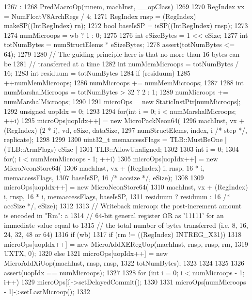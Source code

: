\begin{DoxyCode}
1267                                              :
1268     PredMacroOp(mnem, machInst, __opClass)
1269 {
1270     RegIndex vx = NumFloatV8ArchRegs / 4;
1271     RegIndex rnsp = (RegIndex) makeSP((IntRegIndex) rn);
1272     bool baseIsSP = isSP((IntRegIndex) rnsp);
1273 
1274     numMicroops = wb ? 1 : 0;
1275 
1276     int eSizeBytes = 1 << eSize;
1277     int totNumBytes = numStructElems * eSizeBytes;
1278     assert(totNumBytes <= 64);
1279 
1280     // The guiding principle here is that no more than 16 bytes can be
1281     // transferred at a time
1282     int numMemMicroops = totNumBytes / 16;
1283     int residuum = totNumBytes %
1284     if (residuum)
1285         ++numMemMicroops;
1286     numMicroops += numMemMicroops;
1287 
1288     int numMarshalMicroops = totNumBytes > 32 ? 2 : 1;
1289     numMicroops += numMarshalMicroops;
1290 
1291     microOps = new StaticInstPtr[numMicroops];
1292     unsigned uopIdx = 0;
1293 
1294     for(int i = 0; i < numMarshalMicroops; ++i) {
1295         microOps[uopIdx++] = new MicroPackNeon64(
1296             machInst, vx + (RegIndex) (2 * i), vd, eSize, dataSize,
1297             numStructElems, index, i /* step */, replicate);
1298     }
1299 
1300     uint32_t memaccessFlags = TLB::MustBeOne | (TLB::ArmFlags) eSize |
1301         TLB::AllowUnaligned;
1302 
1303     int i = 0;
1304     for(; i < numMemMicroops - 1; ++i) {
1305         microOps[uopIdx++] = new MicroNeonStore64(
1306             machInst, vx + (RegIndex) i, rnsp, 16 * i, memaccessFlags,
1307             baseIsSP, 16 /* accsize */, eSize);
1308     }
1309     microOps[uopIdx++] = new MicroNeonStore64(
1310         machInst, vx + (RegIndex) i, rnsp, 16 * i, memaccessFlags, baseIsSP,
1311         residuum ? residuum : 16 /* accSize */, eSize);
1312 
1313     // Writeback microop: the post-increment amount is encoded in "Rm": a
1314     // 64-bit general register OR as '11111' for an immediate value equal to
1315     // the total number of bytes transferred (i.e. 8, 16, 24, 32, 48 or 64)
1316     if (wb) {
1317         if (rm != ((RegIndex) INTREG_X31)) {
1318             microOps[uopIdx++] = new MicroAddXERegUop(machInst, rnsp, rnsp, rm,
1319                                                       UXTX, 0);
1320         } else {
1321             microOps[uopIdx++] = new MicroAddXiUop(machInst, rnsp, rnsp,
1322                                                    totNumBytes);
1323         }
1324     }
1325 
1326     assert(uopIdx == numMicroops);
1327 
1328     for (int i = 0; i < numMicroops - 1; i++) {
1329         microOps[i]->setDelayedCommit();
1330     }
1331     microOps[numMicroops - 1]->setLastMicroop();
1332 }

\end{DoxyCode}


